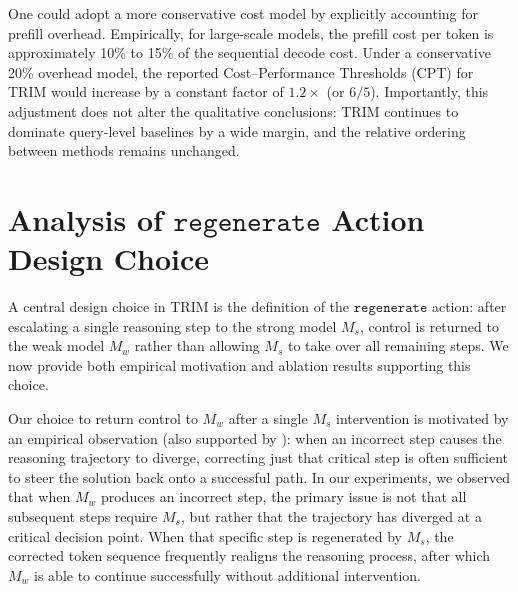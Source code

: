 \documentclass{article}
\theoremstyle{plain}
\theoremstyle{definition}
\theoremstyle{remark}
\newcommand{\regen}{\mathtt{regenerate}}
\begin{document}
One could adopt a more conservative cost model by explicitly accounting for prefill overhead. Empirically, for large-scale models, the prefill cost per token is approximately 10\% to 15\% of the sequential decode cost. Under a conservative 20\% overhead model, the reported Cost–Performance Thresholds (CPT) for TRIM would increase by a constant factor of $1.2\times$ (or $6/5$). Importantly, this adjustment does not alter the qualitative conclusions: TRIM continues to dominate query-level baselines by a wide margin, and the relative ordering between methods remains unchanged.

\section{Analysis of $\regen$ Action Design Choice}
\label{appendix:action_design}
A central design choice in TRIM is the definition of the $\regen$ action: after escalating a single reasoning step to the strong model $M_s$, control is returned to the weak model $M_w$ rather than allowing $M_s$ to take over all remaining steps. We now provide both empirical motivation and ablation results supporting this choice.


Our choice to return control to $M_w$ after a single $M_s$ intervention is motivated by an empirical observation (also supported by \citet{gpo,criticaltokens}): when an incorrect step causes the reasoning trajectory to diverge, correcting just that critical step is often sufficient to steer the solution back onto a successful path. In our experiments, we observed that when $M_w$ produces an incorrect step, the primary issue is not that all subsequent steps require $M_s$, but rather that the trajectory has diverged at a critical decision point. When that specific step is regenerated by $M_s$, the corrected token sequence frequently realigns the reasoning process, after which $M_w$ is able to continue successfully without additional intervention. 
\end{document}
